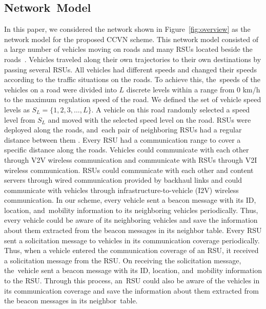 \documentclass[sensors,aricle,accept,pdftex,moreauthors]{Definitions/mdpi}
\begin{document}
\subsection{Network~Model}
In this paper, we considered the network shown in Figure~\ref{fig:overview} as the network model for the proposed CCVN scheme.
This network model consisted of a large number of vehicles moving on roads and many RSUs located beside the roads~\cite{Wang2016, Reis2014}.
Vehicles traveled along their own trajectories to their own destinations by passing several RSUs.
All vehicles had different speeds and changed their speeds according to the traffic situations on the roads.
To achieve this, the~speeds of the vehicles on a road were divided into $L$ discrete levels within a range from 0 km/h to the maximum regulation speed of the road.
We defined the set of vehicle speed levels as $S_{L}=\{1, 2, 3, \ldots, L\}$.
A vehicle on this road randomly selected a speed level from $S_{L}$ and moved with the selected speed level on the road.
RSUs were deployed along the roads, and~each pair of neighboring RSUs had a regular distance between them \cite {ParidelKoosha2012VAdt}.
Every RSU had a communication range to cover a specific distance along the roads.
Vehicles could communicate with each other through {V2V} wireless communication and communicate with RSUs through {V2I} wireless communication.
RSUs could communicate with each other and content servers through wired communication provided by backhaul links and could communicate with vehicles through infrastructure-to-vehicle (I2V) wireless communication.
In our scheme, every vehicle sent a beacon message with its ID, location, and~mobility information to its neighboring vehicles periodically. 
Thus, every vehicle could be aware of its neighboring vehicles and save the information about them extracted from the beacon messages in its neighbor table.
Every RSU sent a solicitation message to vehicles in its communication coverage periodically. 
Thus, when a vehicle entered the communication coverage of an RSU, it received a solicitation message from the RSU.
On receiving the solicitation message, the~vehicle sent a beacon message with its ID, location, and~mobility information to the RSU.
Through this process, an~RSU could also be aware of the vehicles in its communication coverage and save the information about them extracted from the beacon messages in its neighbor~table. 
\end{document}
